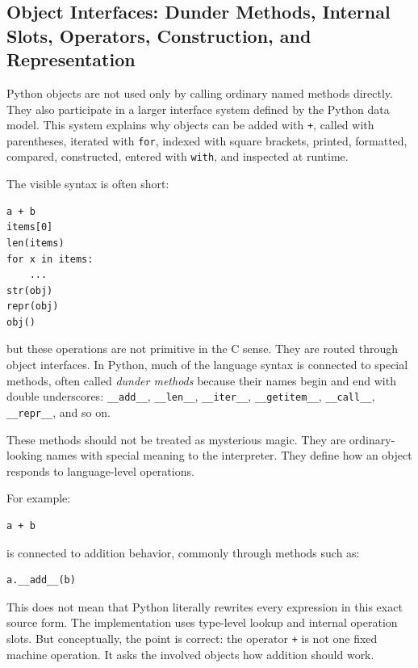 \subsection{Object Interfaces: Dunder Methods, Internal Slots, Operators, Construction, and Representation}

Python objects are not used only by calling ordinary named methods directly. They also participate in a larger interface system defined by the Python data model. This system explains why objects can be added with \texttt{+}, called with parentheses, iterated with \texttt{for}, indexed with square brackets, printed, formatted, compared, constructed, entered with \texttt{with}, and inspected at runtime.

The visible syntax is often short:

\begin{verbatim}
a + b
items[0]
len(items)
for x in items:
    ...
str(obj)
repr(obj)
obj()
\end{verbatim}

but these operations are not primitive in the C sense. They are routed through object interfaces. In Python, much of the language syntax is connected to special methods, often called \emph{dunder methods} because their names begin and end with double underscores: \texttt{\_\_add\_\_}, \texttt{\_\_len\_\_}, \texttt{\_\_iter\_\_}, \texttt{\_\_getitem\_\_}, \texttt{\_\_call\_\_}, \texttt{\_\_repr\_\_}, and so on.

These methods should not be treated as mysterious magic. They are ordinary-looking names with special meaning to the interpreter. They define how an object responds to language-level operations.

For example:

\begin{verbatim}
a + b
\end{verbatim}

is connected to addition behavior, commonly through methods such as:

\begin{verbatim}
a.__add__(b)
\end{verbatim}

This does not mean that Python literally rewrites every expression in this exact source form. The implementation uses type-level lookup and internal operation slots. But conceptually, the point is correct: the operator \texttt{+} is not one fixed machine operation. It asks the involved objects how addition should work.

